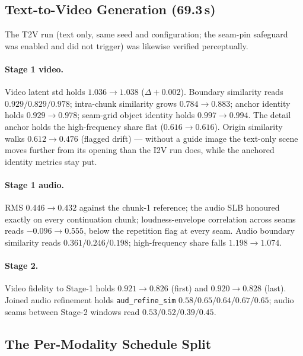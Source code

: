 \documentclass[12pt]{article}
\begin{document}
\subsection{Text-to-Video Generation (\texorpdfstring{69.3\,s}{69.3 s})}
\label{sec:exp_t2v}

The T2V run (text only, same seed and configuration; the seam-pin safeguard
was enabled and did not trigger) was likewise verified perceptually.

\paragraph{Stage 1 video.}  Video latent std holds $1.036\to1.038$
($\Delta+0.002$).  Boundary similarity reads $0.929/0.829/0.978$;
intra-chunk similarity grows $0.784\to0.883$; anchor identity holds
$0.929\to0.978$; seam-grid object identity holds $0.997\to0.994$.  The
detail anchor holds the high-frequency share flat ($0.616\to0.616$).  Origin
similarity walks $0.612\to0.476$ (flagged drift) --- without a guide image
the text-only scene moves further from its opening than the I2V run does,
while the anchored identity metrics stay put.

\paragraph{Stage 1 audio.}  RMS $0.446\to0.432$ against the chunk-1
reference; the audio SLB honoured exactly on every continuation chunk;
loudness-envelope correlation across seams reads $-0.096\to0.555$, below the
repetition flag at every seam.  Audio boundary similarity reads
$0.361/0.246/0.198$; high-frequency share falls $1.198\to1.074$.

\paragraph{Stage 2.}  Video fidelity to Stage-1 holds $0.921\to0.826$
(first) and $0.920\to0.828$ (last).  Joined audio refinement holds
\texttt{aud\_refine\_sim} $0.58/0.65/0.64/0.67/0.65$; audio seams between
Stage-2 windows read $0.53/0.52/0.39/0.45$.

\subsection{The Per-Modality Schedule Split}
\label{sec:exp_split}
\end{document}
